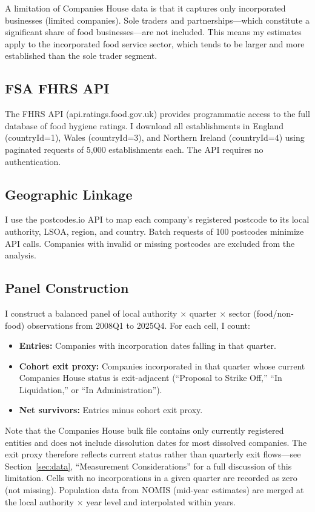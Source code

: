 \documentclass[12pt]{article}
\begin{document}
A limitation of Companies House data is that it captures only incorporated businesses (limited companies). Sole traders and partnerships---which constitute a significant share of food businesses---are not included. This means my estimates apply to the incorporated food service sector, which tends to be larger and more established than the sole trader segment.

\subsection{FSA FHRS API}

The FHRS API (api.ratings.food.gov.uk) provides programmatic access to the full database of food hygiene ratings. I download all establishments in England (countryId=1), Wales (countryId=3), and Northern Ireland (countryId=4) using paginated requests of 5,000 establishments each. The API requires no authentication.

\subsection{Geographic Linkage}

I use the postcodes.io API to map each company's registered postcode to its local authority, LSOA, region, and country. Batch requests of 100 postcodes minimize API calls. Companies with invalid or missing postcodes are excluded from the analysis.

\subsection{Panel Construction}

I construct a balanced panel of local authority $\times$ quarter $\times$ sector (food/non-food) observations from 2008Q1 to 2025Q4. For each cell, I count:
\begin{itemize}
    \item \textbf{Entries:} Companies with incorporation dates falling in that quarter.
    \item \textbf{Cohort exit proxy:} Companies incorporated in that quarter whose current Companies House status is exit-adjacent (``Proposal to Strike Off,'' ``In Liquidation,'' or ``In Administration'').
    \item \textbf{Net survivors:} Entries minus cohort exit proxy.
\end{itemize}

Note that the Companies House bulk file contains only currently registered entities and does not include dissolution dates for most dissolved companies. The exit proxy therefore reflects current status rather than quarterly exit flows---see Section~\ref{sec:data}, ``Measurement Considerations'' for a full discussion of this limitation. Cells with no incorporations in a given quarter are recorded as zero (not missing). Population data from NOMIS (mid-year estimates) are merged at the local authority $\times$ year level and interpolated within years.
\end{document}
